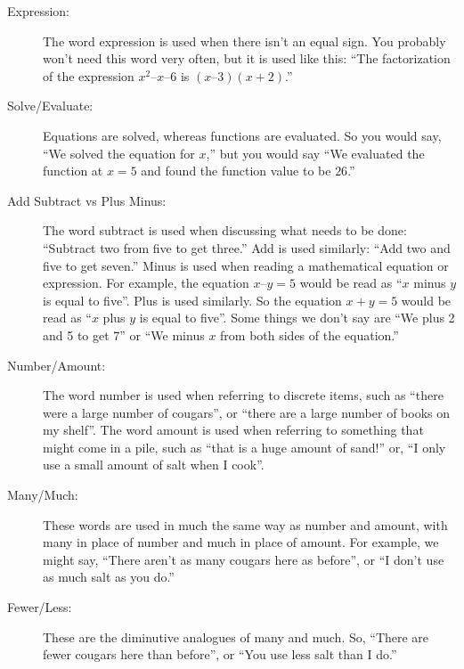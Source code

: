 \begin{description}
    \item[Expression:] The word expression is used when there isn't an equal sign. You
        probably won't need this word very often, but it is used like this: ``The
        factorization of the expression $x^2 – x – 6$ is $(x – 3)(x + 2)$.''

    \item[Solve/Evaluate:] Equations are solved, whereas functions are evaluated. So you
        would say, ``We solved the equation for $x$,'' but you would say ``We evaluated
        the function at $x = 5$ and found the function value to be $26$.''

    \item[Add Subtract vs Plus Minus:] The word subtract is used when discussing what
        needs to be done: ``Subtract two from five to get three.'' Add is used similarly:
        ``Add two and five to get seven.'' Minus is used when reading a mathematical
        equation or expression. For example, the equation $x – y = 5$ would be read as
        ``$x$ minus $y$ is equal to five''. Plus is used similarly. So the equation $x + y
        = 5$ would be read as ``$x$ plus $y$ is equal to five''. Some things we don't say
        are ``We plus 2 and 5 to get 7'' or ``We minus $x$ from both sides of the
        equation.''

    \item[Number/Amount:] The word number is used when referring to discrete items, such
        as ``there were a large number of cougars'', or ``there are a large number of
        books on my shelf''. The word amount is used when referring to something that
        might come in a pile, such as ``that is a huge amount of sand!'' or, ``I only use
        a small amount of salt when I cook''.

    \item[Many/Much:] These words are used in much the same way as number and amount, with
        many in place of number and much in place of amount.  For example, we might say,
        ``There aren't as many cougars here as before'', or ``I don't use as much salt as
        you do.''

    \item[Fewer/Less:] These are the diminutive analogues of many and much. So, ``There
        are fewer cougars here than before'', or ``You use less salt than I do.''
\end{description}






